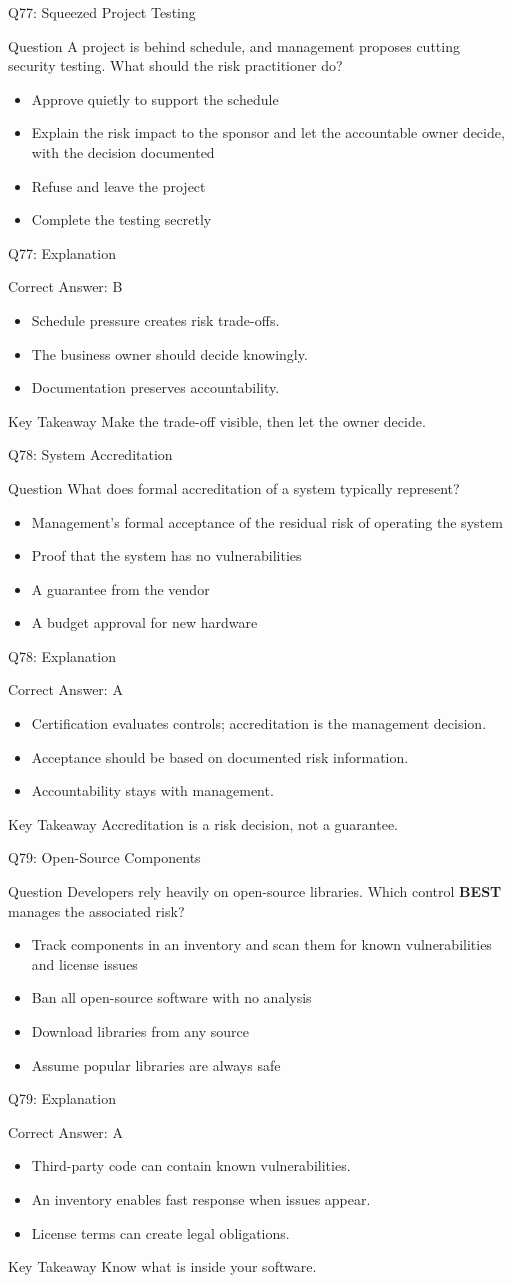 \documentclass[aspectratio=169]{beamer}
\newcommand{\hq}[7]{%
	\begin{frame}{Q#1: #2}
		\begin{block}{Question}
			#3
		\end{block}
		\begin{itemize}
			#4
		\end{itemize}
	\end{frame}
	\begin{frame}{Q#1: Explanation}
		\begin{block}{Correct Answer: #5}
			\begin{itemize}
				#6
			\end{itemize}
		\end{block}
		\begin{alertblock}{Key Takeaway}
			#7
		\end{alertblock}
	\end{frame}
}
\begin{document}
	\hq{77}{Squeezed Project Testing}
	{A project is behind schedule, and management proposes cutting security testing. What should the risk practitioner do?}
	{\item[\textbf{(A)}] Approve quietly to support the schedule
		\item[\textbf{(B)}] Explain the risk impact to the sponsor and let the accountable owner decide, with the decision documented
		\item[\textbf{(C)}] Refuse and leave the project
		\item[\textbf{(D)}] Complete the testing secretly}
	{B}
	{\item Schedule pressure creates risk trade-offs.
		\item The business owner should decide knowingly.
		\item Documentation preserves accountability.}
	{Make the trade-off visible, then let the owner decide.}
	
	\hq{78}{System Accreditation}
	{What does formal accreditation of a system typically represent?}
	{\item[\textbf{(A)}] Management's formal acceptance of the residual risk of operating the system
		\item[\textbf{(B)}] Proof that the system has no vulnerabilities
		\item[\textbf{(C)}] A guarantee from the vendor
		\item[\textbf{(D)}] A budget approval for new hardware}
	{A}
	{\item Certification evaluates controls; accreditation is the management decision.
		\item Acceptance should be based on documented risk information.
		\item Accountability stays with management.}
	{Accreditation is a risk decision, not a guarantee.}
	
	\hq{79}{Open-Source Components}
	{Developers rely heavily on open-source libraries. Which control \textbf{BEST} manages the associated risk?}
	{\item[\textbf{(A)}] Track components in an inventory and scan them for known vulnerabilities and license issues
		\item[\textbf{(B)}] Ban all open-source software with no analysis
		\item[\textbf{(C)}] Download libraries from any source
		\item[\textbf{(D)}] Assume popular libraries are always safe}
	{A}
	{\item Third-party code can contain known vulnerabilities.
		\item An inventory enables fast response when issues appear.
		\item License terms can create legal obligations.}
	{Know what is inside your software.}
	
\end{document}
